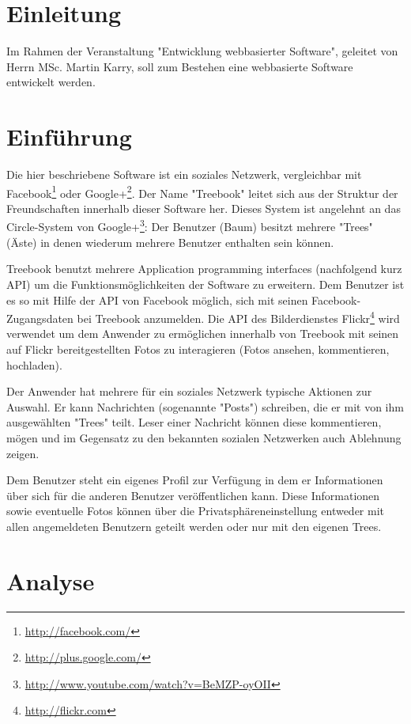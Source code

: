 \documentclass[10pt,a4paper]{book}
\begin{document}
\chapter{Einleitung}
Im Rahmen der Veranstaltung "Entwicklung webbasierter Software", geleitet von Herrn MSc. Martin Karry, soll zum Bestehen eine webbasierte Software entwickelt werden.
\chapter{Einführung}
Die hier beschriebene Software ist ein soziales Netzwerk, vergleichbar mit Facebook\footnote{\href{http://facebook.com/}{http://facebook.com/}} oder Google+\footnote{\href{http://plus.google.com/}{http://plus.google.com/}}. Der Name "Treebook" leitet sich aus der Struktur der Freundschaften innerhalb dieser Software her. Dieses System ist angelehnt an das Circle-System von Google+\footnote{\href{http://www.youtube.com/watch?v=BeMZP-oyOII}{http://www.youtube.com/watch?v=BeMZP-oyOII}}: Der Benutzer (Baum) besitzt mehrere "Trees" (Äste) in denen wiederum mehrere Benutzer enthalten sein können.

Treebook benutzt mehrere Application programming interfaces (nachfolgend kurz API) um die Funktionsmöglichkeiten der Software zu erweitern. Dem Benutzer ist es so mit Hilfe der API von Facebook möglich, sich mit seinen Facebook-Zugangsdaten bei Treebook anzumelden. Die API des Bilderdienstes Flickr\footnote{\href{http://flickr.com}{http://flickr.com}} wird verwendet um dem Anwender zu ermöglichen innerhalb von Treebook mit seinen auf Flickr bereitgestellten Fotos zu interagieren (Fotos ansehen, kommentieren, hochladen).

Der Anwender hat mehrere für ein soziales Netzwerk typische Aktionen zur Auswahl. Er kann Nachrichten (sogenannte "Posts") schreiben, die er mit von ihm ausgewählten "Trees" teilt. Leser einer Nachricht können diese kommentieren, mögen und im Gegensatz zu den bekannten sozialen Netzwerken auch Ablehnung zeigen.

Dem Benutzer steht ein eigenes Profil zur Verfügung in dem er Informationen über sich für die anderen Benutzer veröffentlichen kann. Diese Informationen sowie eventuelle Fotos können über die Privatsphäreneinstellung entweder mit allen angemeldeten Benutzern geteilt werden oder nur mit den eigenen Trees.
\chapter{Analyse}
\end{document}
